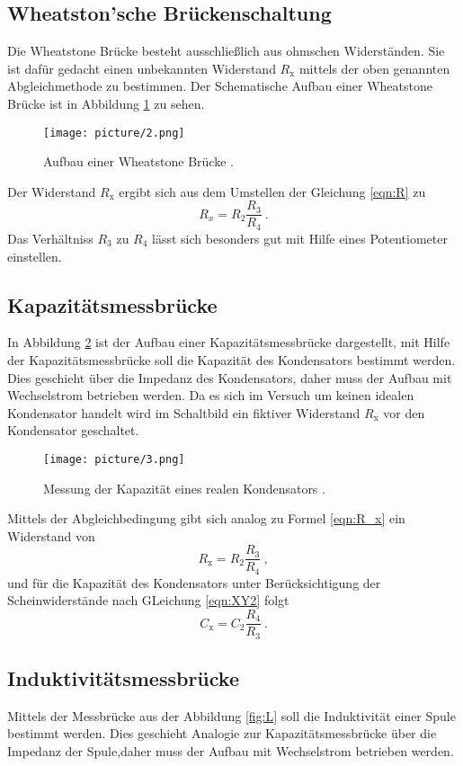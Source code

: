 \subsection{Wheatston'sche Brückenschaltung}
Die Wheatstone Brücke besteht ausschließlich aus ohmschen Widerständen. Sie ist dafür gedacht einen unbekannten Widerstand $R_\text{x}$ mittels der oben genannten Abgleichmethode zu bestimmen. Der Schematische Aufbau einer Wheatstone Brücke ist in Abbildung \ref{fig:widerstand} zu sehen.
\begin{figure}[H]
      \centering
      \texttt{[image: picture/2.png]}
      \caption{Aufbau einer Wheatstone Brücke \cite{sample}.}
      \label{fig:widerstand}
\end{figure}
Der Widerstand $R_\text{x}$ ergibt sich aus dem Umstellen der Gleichung \ref{eqn:R} zu
\begin{equation}
  R_x = R_2 \frac{R_3}{R_4} \ .
  \label{eqn:R_x}
\end{equation}
Das Verhältniss $R_3$ zu $R_4$ lässt sich besonders gut mit Hilfe eines Potentiometer einstellen.
\subsection{Kapazitätsmessbrücke}
In Abbildung \ref{fig:C} ist der Aufbau einer Kapazitätsmessbrücke dargestellt, mit Hilfe der Kapazitätsmessbrücke soll die Kapazität des Kondensators bestimmt werden. Dies geschieht über die Impedanz des Kondensators, daher muss der Aufbau mit Wechselstrom betrieben werden. Da es sich im Versuch um keinen idealen Kondensator handelt wird im Schaltbild ein fiktiver Widerstand $R_\text{x}$ vor den Kondensator geschaltet.
\begin{figure}[H]
  \centering
  \texttt{[image: picture/3.png]}
  \caption{Messung der Kapazität eines realen Kondensators \cite{sample}.}
  \label{fig:C}
\end{figure}
Mittels der Abgleichbedingung gibt sich analog zu Formel \ref{eqn:R_x} ein Widerstand von
\begin{equation*}
    R_\text{x} = R_2 \frac{R_3}{R_4} \ ,
\end{equation*}
und für die Kapazität des Kondensators unter Berücksichtigung der Scheinwiderstände nach GLeichung \ref{eqn:XY2} folgt
\begin{equation}
  C_\text{x} = C_2 \frac{R_4}{R_3} \ .
  \label{eqn:C_x}
\end{equation}

\subsection{Induktivitätsmessbrücke}
Mittels der Messbrücke aus der Abbildung \ref{fig:L} soll die Induktivität einer Spule bestimmt werden. Dies geschieht Analogie zur Kapazitätsmessbrücke über die Impedanz der Spule,daher muss der Aufbau mit Wechselstrom betrieben werden.

